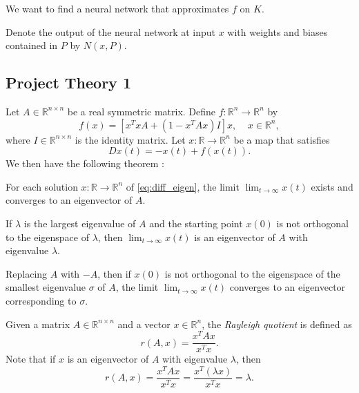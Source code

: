 We want to find a neural network that approximates $f$ on $K$.

Denote the output of the neural network at input $x$ with weights and biases contained in $P$ by $N(x,P)$.


\subsection{Project Theory 1}\label{sec:project theory}


Let $A\in\mathbb{R}^{n\times n}$ be a real symmetric matrix. Define $f\colon\mathbb{R}^n\to\mathbb{R}^n$ by
\[
f(x)=[x^TxA+(1-x^TAx)I]x,\;\;\;\; x\in\mathbb{R}^n,
\]
where $I\in\mathbb{R}^{n\times n}$ is the identity matrix. Let $x\colon\mathbb{R}\to\mathbb{R}^n$ be a map that satisfies
\begin{equation}\label{eq:diff_eigen}
    Dx(t)=-x(t)+f(x(t)).
\end{equation}
We then have the following theorem \cite{yfh04}:
\begin{theorem}
For each solution $x\colon\mathbb{R}\to\mathbb{R}^n$ of \autoref{eq:diff_eigen}, the limit $\lim_{t\to\infty}x(t)$ exists and converges to an eigenvector of $A$.

If $\lambda$ is the largest eigenvalue of $A$ and the starting point $x(0)$ is not orthogonal to the eigenspace of $\lambda$, then $\lim_{t\to\infty}x(t)$ is an eigenvector of $A$ with eigenvalue $\lambda$.

Replacing $A$ with $-A$, then if $x(0)$ is not orthogonal to the eigenspace of the smallest eigenvalue $\sigma$ of $A$, the limit $\lim_{t\to\infty}x(t)$ converges to an eigenvector corresponding to $\sigma$.
\end{theorem}

\begin{definition}
Given a matrix $A\in\mathbb{R}^{n\times n}$ and a vector $x\in\mathbb{R}^n$, the \emph{Rayleigh quotient} is defined as
\begin{equation*}
    r(A,x) = \frac{x^TAx}{x^Tx}.
\end{equation*}
Note that if $x$ is an eigenvector of $A$ with eigenvalue $\lambda$, then
\begin{equation*}
    r(A,x)=\frac{x^TAx}{x^Tx}=\frac{x^T (\lambda x)}{x^T x}=\lambda.
\end{equation*}
\end{definition}
